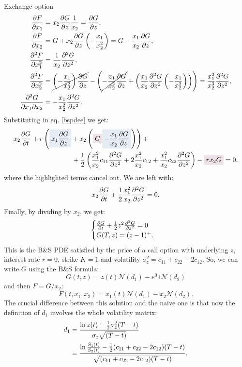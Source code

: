 \begin{example}{Exchange option}{}{}
\begin{align*}
        \pdv{F}{x_1} &= x_2\pdv{G}{z}\dfrac{1}{x_2} = \pdv{G}{z}, \\
        \pdv{F}{x_2} &= G + x_2\pdv{G}{z}\left(-\dfrac{x_1}{x_2^2}\right) = G - \dfrac{x_1}{x_2}\pdv{G}{z}, \\
        \pdv[2]{F}{x_1} &= \dfrac{1}{x_2}\pdv[2]{G}{z}, \\
        \pdv[2]{F}{x_2} &= \cancel{\left(-\dfrac{x_1}{x_2^2 }\right)\pdv{G}{z}} - \left(\cancel{-\dfrac{x_1}{x_2^2}\pdv{G}{z}} + \left(\dfrac{x_1}{x_2} \pdv[2]{G}{z}\left(-\dfrac{x_1}{x_2^2}\right)\right)\right) = \dfrac{x_1^2}{x_2^3}\pdv[2]{G}{z}, \\
        \pdv{G}{x_1}{x_2} &= -\dfrac{x_1}{x_2^2}\pdv[2]{G}{z}.
    \end{align*}
    Substituting in eq. \eqref{bspdee} we get:
    \begin{align*}
        x_2\pdv{G}{t} &+ r\left(\hlc{mylightblue}{x_1\pdv{G}{z}} + x_2\left(\hlc{mypink}{G} \hlc{mylightblue}{- \dfrac{x_1}{x_2}\pdv{G}{z}}\right)\right) + \\
        & \qquad\qquad\qquad
        + \dfrac{1}{2}\left(\dfrac{x_1^2}{x_2}c_{11}\pdv[2]{G}{z} + 2\dfrac{x_1^2}{x_2}c_{12} + \dfrac{x_1^2}{x_2}c_{22}\pdv[2]{G}{z}\right) - \hlc{mypink}{rx_2G} = 0,
    \end{align*}
    where the highlighted terms cancel out. We are left with:
    \begin{equation*}
        x_2\pdv{G}{t} + \dfrac{1}{2}\dfrac{x_1^2}{x_2}\pdv[2]{G}{z}(c_{11}+c_{22}-2c_{12}) = 0.
    \end{equation*}
    Finally, by dividing by $x_2$, we get:
    \begin{equation}
        \begin{cases}
        \pdv{G}{t} + \frac{1}{2}z^2\pdv[2]{G}{z}(c_{11}+c_{22}-2c_{12}) = 0 \\
        G(T,z) = (z-1)^+.
        \end{cases}
    \end{equation}
    This is the B\&S PDE satisfied by the price of a call option with underlying $z$, interest rate $r=0$, strike $K=1$ and volatility $\sigma_z^2 = c_{11}+c_{22}-2c_{12}$. So, we can write $G$ using the B\&S formula:
    \begin{equation}
        G(t,z) = z(t)\mathcal{N}(d_1) - e^{0}1\mathcal{N}(d_2)
    \end{equation}
    and then $F = G/x_2$:
    \begin{equation}
        F(t,x_1,x_2) = x_1(t)\mathcal{N}(d_1)- x_2\mathcal{N}(d_2).
    \end{equation}
    The crucial difference between this solution and the naive one is that now the definition of $d_1$ involves the whole volatility matrix:
    \begin{align}
        \notag d_1 &= \dfrac{\ln z(t)-\frac{1}{2}\sigma_z^2(T-t)}{\sigma_z \sqrt{(T-t)}} \\
        &=
        \dfrac{\ln\frac{S_1(t)}{S_2(t)}-\frac{1}{2}(c_{11}+c_{22}-2c_{12})(T-t)}{\sqrt{(c_{11}+c_{22}-2c_{12})(T-t)}}.
    \end{align}
\end{example}

